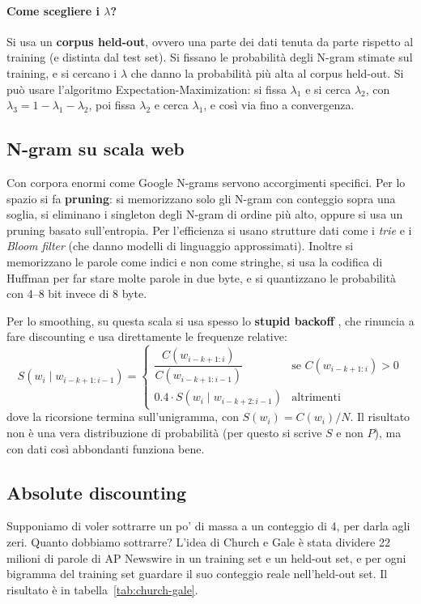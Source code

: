 \paragraph{Come scegliere i $\lambda$?} Si usa un \textbf{corpus held-out}, ovvero una parte dei dati tenuta da parte rispetto al training (e distinta dal test set). Si fissano le probabilità degli N-gram stimate sul training, e si cercano i $\lambda$ che danno la probabilità più alta al corpus held-out. Si può usare l'algoritmo Expectation-Maximization: si fissa $\lambda_1$ e si cerca $\lambda_2$, con $\lambda_3 = 1 - \lambda_1 - \lambda_2$, poi fissa $\lambda_2$ e cerca $\lambda_1$, e così via fino a convergenza.

\subsection{N-gram su scala web}
Con corpora enormi come Google N-grams servono accorgimenti specifici. Per lo spazio si fa \textbf{pruning}: si memorizzano solo gli N-gram con conteggio sopra una soglia, si eliminano i singleton degli N-gram di ordine più alto, oppure si usa un pruning basato sull'entropia. Per l'efficienza si usano strutture dati come i \textit{trie} e i \textit{Bloom filter} (che danno modelli di linguaggio approssimati). Inoltre si memorizzano le parole come indici e non come stringhe, si usa la codifica di Huffman per far stare molte parole in due byte, e si quantizzano le probabilità con 4--8 bit invece di 8 byte.

Per lo smoothing, su questa scala si usa spesso lo \textbf{stupid backoff} \cite{brants2007}, che rinuncia a fare discounting e usa direttamente le frequenze relative:
\begin{equation}
S(w_i \mid w_{i-k+1:i-1}) = \begin{cases} \dfrac{C(w_{i-k+1:i})}{C(w_{i-k+1:i-1})} & \text{se } C(w_{i-k+1:i}) > 0 \\[8pt] 0.4 \cdot S(w_i \mid w_{i-k+2:i-1}) & \text{altrimenti} \end{cases}
\end{equation}
dove la ricorsione termina sull'unigramma, con $S(w_i) = C(w_i)/N$. Il risultato non è una vera distribuzione di probabilità (per questo si scrive $S$ e non $P$), ma con dati così abbondanti funziona bene.

\subsection{Absolute discounting}
Supponiamo di voler sottrarre un po' di massa a un conteggio di 4, per darla agli zeri. Quanto dobbiamo sottrarre? L'idea di Church e Gale \cite{church1991} è stata dividere 22 milioni di parole di AP Newswire in un training set e un held-out set, e per ogni bigramma del training set guardare il suo conteggio reale nell'held-out set. Il risultato è in tabella~\ref{tab:church-gale}.

